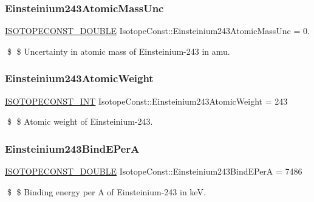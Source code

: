 \subsubsection{\texorpdfstring{Einsteinium243\+Atomic\+Mass\+Unc}{Einsteinium243AtomicMassUnc}}
{\footnotesize\ttfamily \mbox{\hyperlink{group___isotope_const-_macros_ga8f45a7272ce02c0b4c65c44636ed719a}{I\+S\+O\+T\+O\+P\+E\+C\+O\+N\+S\+T\+\_\+\+D\+O\+U\+B\+LE}} Isotope\+Const\+::\+Einsteinium243\+Atomic\+Mass\+Unc = 0.}

\$ \$ Uncertainty in atomic mass of Einsteinium-\/243 in amu. \mbox{\label{group___isotope_const-_einsteinium-_es243_gac05c882b084f2f8aa59f2426e5f2f022}} 
\subsubsection{\texorpdfstring{Einsteinium243\+Atomic\+Weight}{Einsteinium243AtomicWeight}}
{\footnotesize\ttfamily \mbox{\hyperlink{group___isotope_const-_macros_ga5f18360b3e99483a35c32d789e62621c}{I\+S\+O\+T\+O\+P\+E\+C\+O\+N\+S\+T\+\_\+\+I\+NT}} Isotope\+Const\+::\+Einsteinium243\+Atomic\+Weight = 243}

\$ \$ Atomic weight of Einsteinium-\/243. \mbox{\label{group___isotope_const-_einsteinium-_es243_ga44fd71781ce9b1207876da4e7d82e5a9}} 
\subsubsection{\texorpdfstring{Einsteinium243\+Bind\+E\+PerA}{Einsteinium243BindEPerA}}
{\footnotesize\ttfamily \mbox{\hyperlink{group___isotope_const-_macros_ga8f45a7272ce02c0b4c65c44636ed719a}{I\+S\+O\+T\+O\+P\+E\+C\+O\+N\+S\+T\+\_\+\+D\+O\+U\+B\+LE}} Isotope\+Const\+::\+Einsteinium243\+Bind\+E\+PerA = 7486}

\$ \$ Binding energy per A of Einsteinium-\/243 in keV. \mbox{\label{group___isotope_const-_einsteinium-_es243_ga6a0ce93dc29daf0550567997ece271f1}} 
